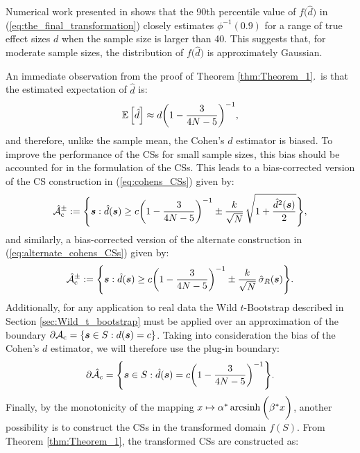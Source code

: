 Numerical work presented in \textit{\citet*{Laubscher1960-px}} shows that the 90th percentile value of $f\Big(\hat{d}\Big)$ in (\ref{eq:the_final_transformation}) closely estimates $\phi^{-1}({0.9})$ for a range of true effect sizes $d$ when the sample size is larger than 40. This suggests that, for moderate sample sizes, the distribution of $f\Big(\hat{d}\Big)$ is approximately Gaussian.

An immediate observation from the proof of Theorem \ref{thm:Theorem_1}.\ is that the estimated expectation of $\hat{d}$ is: 
\begin{equation}
\label{eq:estimated_expection_of_d_hat}
\operatorname*{\mathbb{E}}\Big[\hat{d}\Big] \approx d \bigg(1 - \frac{3}{4N - 5}\bigg)^{-1},
\end{equation}
and therefore, unlike the sample mean, the Cohen's $d$ estimator is biased. To improve the performance of the CSs for small sample sizes, this bias should be accounted for in the formulation of the CSs. This leads to a bias-corrected version of the CS construction in (\ref{eq:cohens_CSs}) given by: 
\begin{equation}
\label{eq:bias_corrected_cohens_CSs}
\operatorname{\hat{\mathcal{A}}_{c}^\pm} := \Bigg\{\bm{s} : \hat{d}(\bm{s}) \geq c\bigg(1 - \frac{3}{4N - 5}\bigg)^{-1} \pm \frac{k}{{\sqrt{N}}}\, \sqrt{1 + \frac{\hat{d}^{2}({\bm{s}})}{2}}\Bigg\}, 
\end{equation}
and similarly, a bias-corrected version of the alternate construction in (\ref{eq:alternate_cohens_CSs}) given by:
\begin{equation}
\label{eq:bias_corrected_alternate_cohens_CSs}
\operatorname{\hat{\mathcal{A}}_{c}^\pm} := \Bigg\{\bm{s} : \hat{d}(\bm{s}) \geq c\bigg(1 - \frac{3}{4N - 5}\bigg)^{-1} \pm \frac{k}{\sqrt{N}}\, \hat{\sigma}_{R}(\bm{s}) \Bigg\}.
\end{equation}
Additionally, for any application to real data the Wild $t$-Bootstrap described in Section \ref{sec:Wild_t_bootstrap} must be applied over an approximation of the boundary $\operatorname{\partial\mathcal{A}_{c}} = \{\bm{s} \in S : d(\bm{s}) = c \}$. Taking into consideration the bias of the Cohen's $d$ estimator, we will therefore use the plug-in boundary:
\begin{equation}
\label{eq:plug_in_boundary}
\operatorname{\partial\hat{\mathcal{A}}_{c}} = \Bigg\{\bm{s} \in S : \hat{d}(\bm{s}) = c\bigg(1 - \frac{3}{4N - 5}\bigg)^{-1} \Bigg\}.
\end{equation}
Finally, by the monotonicity of the mapping $x \mapsto \alpha^{*} \operatorname{arcsinh}\bigg({\beta^{*} x}\bigg)$, another possibility is to construct the CSs in the transformed domain $f(S)$. From Theorem \ref{thm:Theorem_1}, the transformed CSs are constructed as:
